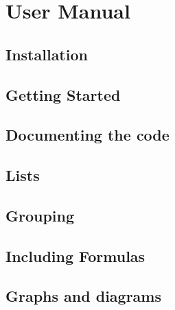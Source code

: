 \documentclass[a4paper]{report}
\begin{document}
\clearemptydoublepage
\tableofcontents
\clearemptydoublepage
{}

\part{User Manual}
\chapter{Installation}\label{install}\hypertarget{install}{}
\chapter{Getting Started}\label{starting}\hypertarget{starting}{}
\chapter{Documenting the code}\label{docblocks}\hypertarget{docblocks}{}
\chapter{Lists}\label{lists}\hypertarget{lists}{}
\chapter{Grouping}\label{grouping}\hypertarget{grouping}{}
\chapter{Including Formulas}\label{formulas}\hypertarget{formulas}{}
\chapter{Graphs and diagrams}\label{diagrams}\hypertarget{diagrams}{}
\end{document}

